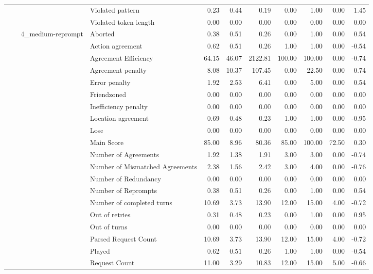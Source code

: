\begin{tabular}{llllrrrrrrr}
 &  &  & Violated pattern & 0.23 & 0.44 & 0.19 & 0.00 & 1.00 & 0.00 & 1.45 \\
 &  &  & Violated token length & 0.00 & 0.00 & 0.00 & 0.00 & 0.00 & 0.00 & 0.00 \\
\cline{3-11}
 &  & \multirow[t]{27}{*}{4_medium-reprompt} & Aborted & 0.38 & 0.51 & 0.26 & 0.00 & 1.00 & 0.00 & 0.54 \\
 &  &  & Action agreement & 0.62 & 0.51 & 0.26 & 1.00 & 1.00 & 0.00 & -0.54 \\
 &  &  & Agreement Efficiency & 64.15 & 46.07 & 2122.81 & 100.00 & 100.00 & 0.00 & -0.74 \\
 &  &  & Agreement penalty & 8.08 & 10.37 & 107.45 & 0.00 & 22.50 & 0.00 & 0.74 \\
 &  &  & Error penalty & 1.92 & 2.53 & 6.41 & 0.00 & 5.00 & 0.00 & 0.54 \\
 &  &  & Friendzoned & 0.00 & 0.00 & 0.00 & 0.00 & 0.00 & 0.00 & 0.00 \\
 &  &  & Inefficiency penalty & 0.00 & 0.00 & 0.00 & 0.00 & 0.00 & 0.00 & 0.00 \\
 &  &  & Location agreement & 0.69 & 0.48 & 0.23 & 1.00 & 1.00 & 0.00 & -0.95 \\
 &  &  & Lose & 0.00 & 0.00 & 0.00 & 0.00 & 0.00 & 0.00 & 0.00 \\
 &  &  & Main Score & 85.00 & 8.96 & 80.36 & 85.00 & 100.00 & 72.50 & 0.30 \\
 &  &  & Number of Agreements & 1.92 & 1.38 & 1.91 & 3.00 & 3.00 & 0.00 & -0.74 \\
 &  &  & Number of Mismatched Agreements & 2.38 & 1.56 & 2.42 & 3.00 & 4.00 & 0.00 & -0.76 \\
 &  &  & Number of Redundancy & 0.00 & 0.00 & 0.00 & 0.00 & 0.00 & 0.00 & 0.00 \\
 &  &  & Number of Reprompts & 0.38 & 0.51 & 0.26 & 0.00 & 1.00 & 0.00 & 0.54 \\
 &  &  & Number of completed turns & 10.69 & 3.73 & 13.90 & 12.00 & 15.00 & 4.00 & -0.72 \\
 &  &  & Out of retries & 0.31 & 0.48 & 0.23 & 0.00 & 1.00 & 0.00 & 0.95 \\
 &  &  & Out of turns & 0.00 & 0.00 & 0.00 & 0.00 & 0.00 & 0.00 & 0.00 \\
 &  &  & Parsed Request Count & 10.69 & 3.73 & 13.90 & 12.00 & 15.00 & 4.00 & -0.72 \\
 &  &  & Played & 0.62 & 0.51 & 0.26 & 1.00 & 1.00 & 0.00 & -0.54 \\
 &  &  & Request Count & 11.00 & 3.29 & 10.83 & 12.00 & 15.00 & 5.00 & -0.66 \\

\end{tabular}
